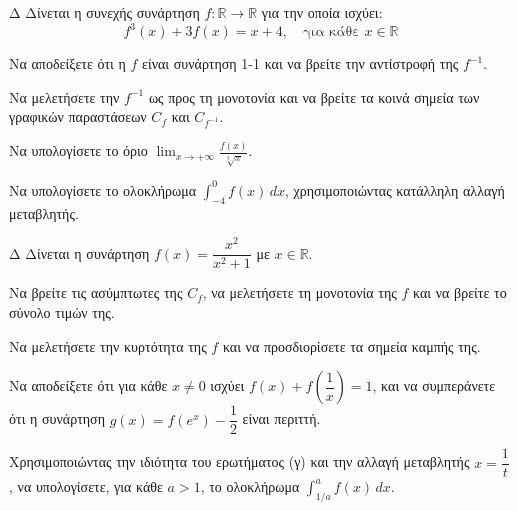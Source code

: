 \begin{thema}{Δ}
Δίνεται η συνεχής συνάρτηση $f: \mathbb{R} \to \mathbb{R}$ για την οποία ισχύει:
\[ f^3(x) + 3f(x) = x + 4, \quad \text{για κάθε } x \in \mathbb{R} \]
\begin{erwthma}
    \item Να αποδείξετε ότι η $f$ είναι συνάρτηση 1-1 και να βρείτε την αντίστροφή της $f^{-1}$.
    \item Να μελετήσετε την $f^{-1}$ ως προς τη μονοτονία και να βρείτε τα κοινά σημεία των γραφικών παραστάσεων $C_f$ και $C_{f^{-1}}$.
    \item Να υπολογίσετε το όριο $\displaystyle{\lim_{x\to +\infty} \frac{f(x)}{\sqrt[3]{x}}}$.
    \item Να υπολογίσετε το ολοκλήρωμα $\displaystyle\int_{-4}^{0} f(x)\,dx$, χρησιμοποιώντας κατάλληλη αλλαγή μεταβλητής.
\end{erwthma}
\end{thema}

\begin{thema}{Δ}
Δίνεται η συνάρτηση $f(x) = \dfrac{x^2}{x^2+1}$ με $x \in \mathbb{R}$.
\begin{erwthma}
    \item Να βρείτε τις ασύμπτωτες της $C_f$, να μελετήσετε τη μονοτονία της $f$ και να βρείτε το σύνολο τιμών της.
    \item Να μελετήσετε την κυρτότητα της $f$ και να προσδιορίσετε τα σημεία καμπής της.
    \item Να αποδείξετε ότι για κάθε $x \neq 0$ ισχύει $f(x) + f\!\left(\dfrac{1}{x}\right) = 1$, και να συμπεράνετε ότι η συνάρτηση $g(x) = f(e^x) - \dfrac{1}{2}$ είναι περιττή.
    \item Χρησιμοποιώντας την ιδιότητα του ερωτήματος (γ) και την αλλαγή μεταβλητής $x = \dfrac{1}{t}$, να υπολογίσετε, για κάθε $a > 1$, το ολοκλήρωμα $\displaystyle\int_{1/a}^{a} f(x)\,dx$.
\end{erwthma}
\end{thema}

